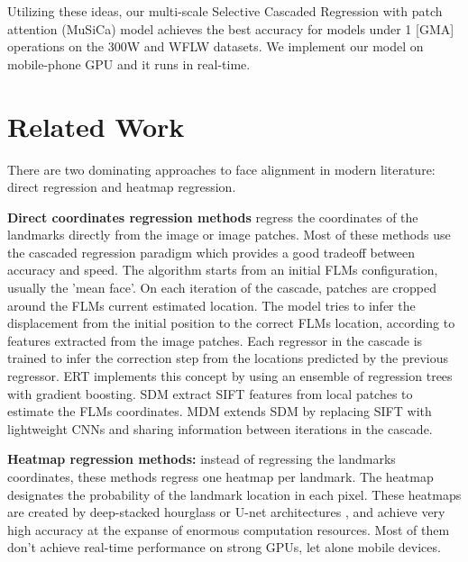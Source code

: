 \documentclass[twocolumn]{article}
\begin{document}
Utilizing these ideas, our multi-scale Selective Cascaded Regression with patch attention (MuSiCa) model achieves the best accuracy for models under 1 [GMA] operations on the 300W and WFLW datasets. We implement our model on mobile-phone GPU and it runs in real-time.



\section{Related Work}

There are two dominating approaches to face alignment in modern literature: direct regression and heatmap regression.

\textbf{Direct coordinates regression methods} regress the coordinates of the landmarks directly from the image or image patches. Most of these methods use the cascaded regression paradigm \cite{wu2017facial, mahpod2021facial, lee2015face, trigeorgis2016mnemonic, kazemi2014one, xiong2013supervised} which provides a good tradeoff between accuracy and speed. The algorithm starts from an initial FLMs configuration, usually the 'mean face'. On each iteration of the cascade, patches are cropped around the FLMs current estimated location. The model tries to infer the displacement from the initial position to the correct FLMs location, according to features extracted from the image patches. Each regressor in the cascade is trained to infer the correction step from the locations predicted by the previous regressor. ERT \cite{kazemi2014one} implements this concept by using an ensemble of regression trees with gradient boosting. SDM \cite{xiong2013supervised} extract SIFT features from local patches to estimate the FLMs coordinates. MDM \cite{trigeorgis2016mnemonic} extends SDM by replacing SIFT with lightweight CNNs and sharing information between iterations in the cascade. 

\textbf{Heatmap regression methods:} instead of regressing the landmarks coordinates, these methods regress one heatmap per landmark. The heatmap designates the probability of the landmark location in each pixel. These heatmaps are created by deep-stacked hourglass \cite{chen2019face, liu2019semantic, wu2018look} or U-net architectures \cite{dapogny2019decafa}, and achieve very high accuracy at the expanse of enormous computation resources. Most of them don't achieve real-time performance on strong GPUs, let alone mobile devices.
\end{document}
